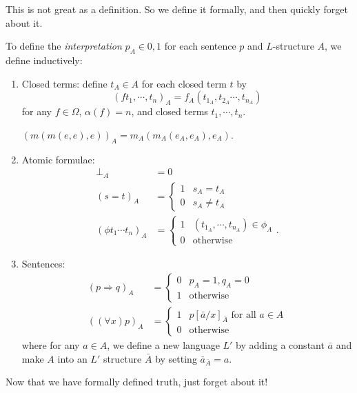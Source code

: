 \documentclass[a4paper]{article}
\begin{document}
This is not great as a definition. So we define it formally, and then quickly forget about it.

\begin{defi}[Interpretation]
  To define the \emph{interpretation} $p_A\in {0, 1}$ for each sentence $p$ and $L$-structure $A$, we define inductively:
  \begin{enumerate}
    \item Closed terms: define $t_A\in A$ for each closed term $t$ by
      \[
        (ft_1, \cdots, t_n)_A = f_A(t_{1_A}, t_{2_A}\cdots, t_{n_A})
      \]
      for any $f\in \Omega$, $\alpha(f) = n$, and closed terms $t_1, \cdots, t_n$.

      \begin{eg}
        $(m(m(e,e),e))_A = m_A(m_A(e_A, e_A),e_A)$.
      \end{eg}
    \item Atomic formulae:
      \begin{align*}
        \bot_A &= 0\\
        (s = t)_A &=
        \begin{cases}
          1 & s_A = t_A\\
          0 & s_A \not= t_A
        \end{cases}\\
        (\phi t_1 \cdots t_n)_A &=
        \begin{cases}
          1 & (t_{1_A}, \cdots, t_{n_A})\in \phi_A \\
          0 & \text{otherwise}
        \end{cases}.
      \end{align*}
    \item Sentences:
      \begin{align*}
        (p\Rightarrow q)_A &=
        \begin{cases}
          0 & p_A = 1, q_A = 0\\
          1 & \text{otherwise}
        \end{cases}\\
        ((\forall x)p)_A &=
        \begin{cases}
          1 & p[\bar a/x]_{\bar A} \text{ for all }a\in A\\
          0 & \text{otherwise}
        \end{cases}
      \end{align*}
      where for any $a\in A$, we define a new language $L'$ by adding a constant $\bar a$ and make $A$ into an $L'$ structure $\bar A$ by setting $\bar a_{\bar A} = a$.
  \end{enumerate}
\end{defi}
Now that we have formally defined truth, just forget about it!
\end{document}
